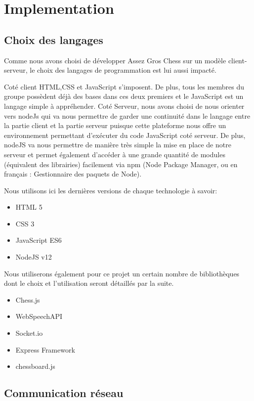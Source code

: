 \documentclass[12pt, openany]{report}
\begin{document}
\chapter{Implementation}

\section{Choix des langages}

Comme nous avons choisi de développer Assez Gros Chess sur un modèle client-serveur, le choix des langages de programmation est lui aussi impacté.

Coté client HTML,CSS et JavaScript s'imposent. De plus, tous les membres du groupe possèdent déjà des bases dans ces deux premiers et le JavaScript est un langage simple à appréhender.
Coté Serveur, nous avons choisi de nous orienter vers nodeJs qui va nous permettre de garder une continuité dans le langage entre la partie client et la partie serveur puisque cette plateforme nous offre un environnement permettant d'exécuter du code JavaScript coté serveur. De plus, nodeJS va nous permettre de manière très simple la mise en place de notre serveur et permet également d'accéder à une grande quantité de modules (équivalent des librairies) facilement via npm (Node Package Manager, ou en français : Gestionnaire des paquets de Node). 

Nous utilisons ici les dernières versions de chaque technologie à savoir:
\begin{itemize}
    \item HTML 5
    \item CSS 3
    \item JavaScript ES6
    \item NodeJS v12
\end{itemize}

Nous utiliserons également pour ce projet un certain nombre de bibliothèques dont le choix et l'utilisation seront détaillés par la suite.

\begin{itemize}
    \item Chess.js
    \item WebSpeechAPI
    \item Socket.io
    \item Express Framework
    \item chessboard.js
\end{itemize}

\newpage
\section{Communication réseau}
\end{document}
